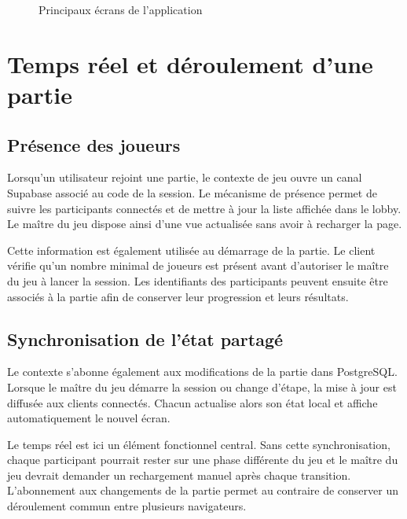 \begin{figure}[H]
\centering
{}
\caption{Principaux écrans de l'application}
\label{fig:brise-glace-ecrans}
\end{figure}

\section{Temps réel et déroulement d'une partie}

\subsection{Présence des joueurs}

Lorsqu'un utilisateur rejoint une partie, le contexte de jeu ouvre un canal Supabase associé au code de la session. Le mécanisme de présence permet de suivre les participants connectés et de mettre à jour la liste affichée dans le lobby. Le maître du jeu dispose ainsi d'une vue actualisée sans avoir à recharger la page.

Cette information est également utilisée au démarrage de la partie. Le client vérifie qu'un nombre minimal de joueurs est présent avant d'autoriser le maître du jeu à lancer la session. Les identifiants des participants peuvent ensuite être associés à la partie afin de conserver leur progression et leurs résultats.

\subsection{Synchronisation de l'état partagé}

Le contexte s'abonne également aux modifications de la partie dans PostgreSQL. Lorsque le maître du jeu démarre la session ou change d'étape, la mise à jour est diffusée aux clients connectés. Chacun actualise alors son état local et affiche automatiquement le nouvel écran.

Le temps réel est ici un élément fonctionnel central. Sans cette synchronisation, chaque participant pourrait rester sur une phase différente du jeu et le maître du jeu devrait demander un rechargement manuel après chaque transition. L'abonnement aux changements de la partie permet au contraire de conserver un déroulement commun entre plusieurs navigateurs.

